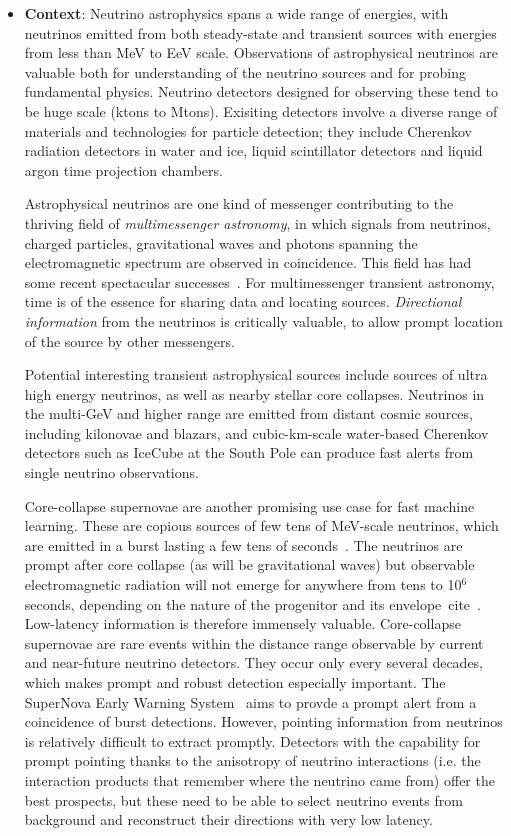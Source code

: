 \begin{itemize}

  
\item \textbf{Context}: Neutrino astrophysics spans a wide range of energies, with neutrinos emitted from both steady-state and transient sources with energies from less than MeV to EeV scale.  Observations of astrophysical neutrinos are valuable both for understanding of the neutrino sources and for probing fundamental physics.  Neutrino detectors designed for observing these tend to be huge scale (ktons to Mtons).  Exisiting detectors involve a diverse range of materials and technologies for particle detection; they include Cherenkov radiation detectors in water and ice, liquid scintillator detectors and liquid argon time projection chambers.
  
Astrophysical neutrinos are one kind of messenger contributing to the thriving field of \textit{multimessenger astronomy}, in which signals from neutrinos, charged particles, gravitational waves and photons spanning the electromagnetic spectrum are observed in coincidence.  This field has had some recent spectacular successes~\cite{Abbott_2017,AaAc2018,GrFo2020}.  For multimessenger transient astronomy, time is of the essence for sharing data and locating sources.  \textit{Directional information} from the neutrinos is critically valuable, to allow prompt location of the source by other messengers.

Potential interesting transient astrophysical sources include sources of ultra high energy neutrinos, as well as nearby stellar core collapses.   Neutrinos in the multi-GeV and higher range are emitted from distant cosmic sources, including kilonovae and blazars, and cubic-km-scale water-based Cherenkov detectors such as IceCube at the South Pole can produce fast alerts from  single neutrino observations.

Core-collapse supernovae are another promising use case for fast machine learning.  These are copious sources of few tens of MeV-scale neutrinos, which are emitted in a burst lasting a few tens of seconds~\cite{Scholberg:2012id,Mirizzi:2015eza}. The neutrinos are prompt after core collapse (as will be gravitational waves) but observable electromagnetic radiation will not emerge for anywhere from tens to 10$^6$ seconds, depending on the nature of the progenitor and its envelope~cite~\cite{Kistler:2012as}.  Low-latency information is therefore immensely valuable.  Core-collapse supernovae are rare events within the distance range observable by current and near-future neutrino detectors.  They occur only every several decades, which makes prompt and robust detection especially important.  The SuperNova Early Warning System~\cite{Antonioli:2004zb,Kharusi:2020ovw} aims to provde a prompt alert from a coincidence of burst detections.  However, pointing information from neutrinos is relatively difficult to extract promptly.  Detectors with the capability for prompt pointing thanks to the anisotropy of neutrino interactions (i.e. the interaction products that remember where the neutrino came from) offer the best prospects, but these need to be able to select neutrino events from background and reconstruct their directions with very low latency.


\end{itemize}
